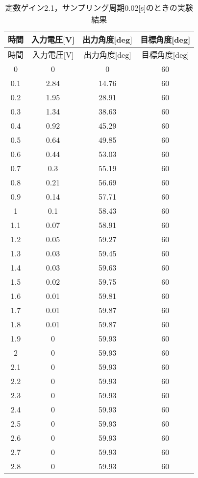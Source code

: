 \begin{longtable}[c]{|c|c|c|c|}
  \caption{定数ゲイン2.1，サンプリング周期0.02[s]のときの実験結果}
  \label{tab5} \\
  \hline
   時間& 	入力電圧[V]&	出力角度[deg]&	目標角度[deg] \\ \hline \hline \endfirsthead 
\hline \endhead
\hline \endfoot
\hline \endlastfoot
時間& 	入力電圧[V]&    出力角度[deg]&	目標角度[deg] \\ \hline
0   & 	0    & 	0     &	60 \\ \hline 
0.1 &	2.84 &	14.76 &	60 \\ \hline 
0.2 &	1.95 &	28.91 &	60 \\ \hline 
0.3 &	1.34 &	38.63 &	60 \\ \hline 
0.4 &	0.92 &	45.29 &	60 \\ \hline 
0.5 &	0.64 &	49.85 &	60 \\ \hline 
0.6 &	0.44 &	53.03 &	60 \\ \hline 
0.7 &	0.3  &	55.19 &	60 \\ \hline 
0.8 &	0.21 &	56.69 &	60 \\ \hline 
0.9 &	0.14 &	57.71 &	60 \\ \hline 
1   &	0.1  &	58.43 &	60 \\ \hline 
1.1 &	0.07 &	58.91 &	60 \\ \hline 
1.2 &	0.05 &	59.27 &	60 \\ \hline 
1.3 &	0.03 &	59.45 &	60 \\ \hline 
1.4 &	0.03 &	59.63 &	60 \\ \hline 
1.5 &	0.02 &	59.75 &	60 \\ \hline 
1.6 &	0.01 &	59.81 &	60 \\ \hline 
1.7 &	0.01 &	59.87 &	60 \\ \hline 
1.8 &	0.01 &	59.87 &	60 \\ \hline 
1.9 &	0    &	59.93 &	60 \\ \hline 
2   &	0    &	59.93 &	60 \\ \hline 
2.1 &	0    &	59.93 &	60 \\ \hline 
2.2 &	0    &	59.93 &	60 \\ \hline 
2.3 &	0    &	59.93 &	60 \\ \hline 
2.4 &	0    &	59.93 &	60 \\ \hline 
2.5 &	0    &	59.93 &	60 \\ \hline 
2.6 &	0    &	59.93 &	60 \\ \hline 
2.7 &	0    &	59.93 &	60 \\ \hline 
2.8 &	0    &	59.93 &	60 \\ \hline 

\end{longtable}
